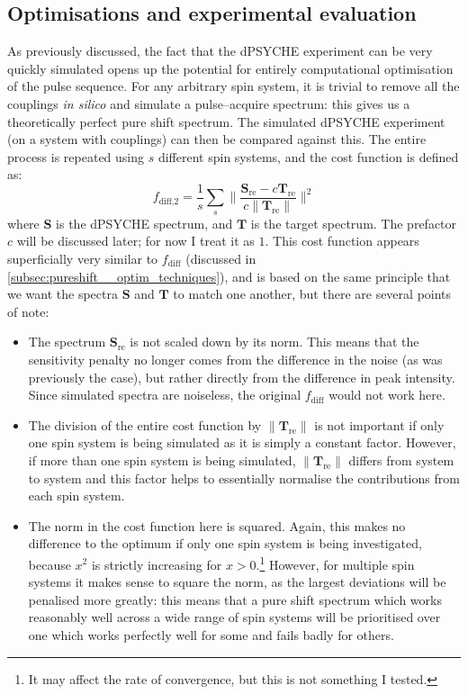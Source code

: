 \subsection{Optimisations and experimental evaluation}
\label{subsec:pureshift__dpsyche_optimisation}

As previously discussed, the fact that the dPSYCHE experiment can be very quickly simulated opens up the potential for entirely computational optimisation of the pulse sequence.
For any arbitrary spin system, it is trivial to remove all the couplings \textit{in silico} and simulate a pulse--acquire spectrum: this gives us a theoretically perfect pure shift spectrum.
The simulated dPSYCHE experiment (on a system with couplings) can then be compared against this.
The entire process is repeated using $s$ different spin systems, and the cost function is defined as:
\begin{equation}
    \label{eq:f_diff_dpsyche}
    f_\text{diff,2} = \frac{1}{s}\sum_s \Biggl\lVert \frac{\symbf{S}_\text{re} - c\symbf{T}_\text{re}}{c\lVert \symbf{T}_\text{re} \rVert} \Biggr\rVert^2
\end{equation}
where $\symbf{S}$ is the dPSYCHE spectrum, and $\symbf{T}$ is the target spectrum.
The prefactor $c$ will be discussed later; for now I treat it as $1$.
This cost function appears superficially very similar to $f_\text{diff}$ (discussed in \cref{subsec:pureshift__optim_techniques}), and is based on the same principle that we want the spectra $\symbf{S}$ and $\symbf{T}$ to match one another, but there are several points of note:
\begin{itemize}
    \item The spectrum $\symbf{S}_\text{re}$ is not scaled down by its norm. This means that the sensitivity penalty no longer comes from the difference in the noise (as was previously the case), but rather directly from the difference in peak intensity.
        Since simulated spectra are noiseless, the original $f_\text{diff}$ would not work here.
    \item The division of the entire cost function by $\lVert\symbf{T}_\text{re}\rVert$ is not important if only one spin system is being simulated as it is simply a constant factor.
        However, if more than one spin system is being simulated, $\lVert\symbf{T}_\text{re}\rVert$ differs from system to system and this factor helps to essentially normalise the contributions from each spin system.
    \item The norm in the cost function here is squared.
        Again, this makes no difference to the optimum if only one spin system is being investigated, because $x^2$ is strictly increasing for $x > 0$.\footnote{It may affect the rate of convergence, but this is not something I tested.}
        However, for multiple spin systems it makes sense to square the norm, as the largest deviations will be penalised more greatly: this means that a pure shift spectrum which works reasonably well across a wide range of spin systems will be prioritised over one which works perfectly well for some and fails badly for others.
\end{itemize}

